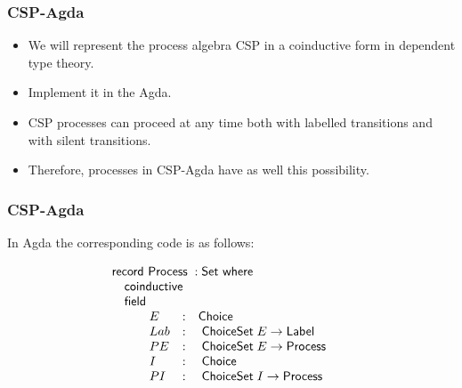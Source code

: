 \documentclass{beamer}
\newcommand{\ar}{\rightarrow}
\newcommand{\wheresf}{\mathsf{where}}
\newcommand{\Set}{\mathsf{Set}}
\newcommand{\record}{\mathsf{record}}
\newcommand{\coinductive}{\mathsf{coinductive}}
\newcommand{\field}{\mathsf{field}}
\newcommand{\Process}{\mathsf{Process}}
\newcommand{\Choice}{\mathsf{Choice}}
\newcommand{\ChoiceSet}{\mathsf{ChoiceSet}}
\newcommand{\Label}{\mathsf{Label}}
\begin{document}







\begin{frame}
\frametitle{CSP-Agda}

\begin{itemize}

\item We will represent the process algebra CSP in a coinductive form in dependent type theory.

\item Implement it in the Agda.

\item CSP processes can proceed at any time both with labelled transitions and with silent transitions.

\item Therefore, processes in CSP-Agda have as well this possibility.


\end{itemize}
\end{frame}




\begin{frame}
\frametitle{CSP-Agda}

In Agda the corresponding code is as follows: %

\[\begin{array}[t]{@{}l} 
\record\ \Process\;: \Set\ \wheresf  \\
\mbox{\quad}
\begin{array}[t]{@{}lcl} 
\coinductive \\
\field \\
\mbox{\quad} \begin{array}[t]{@{}l}
\begin{array}[t]{@{}cl@{}lcl}
 & E & &:& \Choice \\
 & Lab&  &:& \; \ChoiceSet \;E \ar \Label\\
 & PE &   &:& \; \ChoiceSet\;E \ar \Process\\
 & I  &  &:&\;  \Choice\\
 & PI &  &:& \; \ChoiceSet \;I  \ar \Process\\

\end{array} 
\end{array} 
\end{array} 
\end{array} \]


\end{frame}
\end{document}
